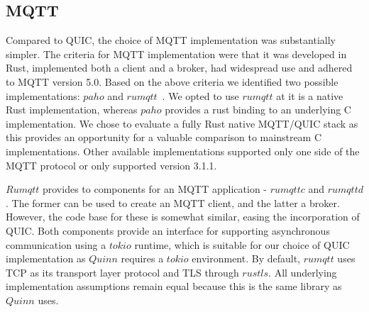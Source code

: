 \subsection{MQTT}\label{section:mqtt_impls}

Compared to QUIC, the choice of MQTT implementation was substantially simpler.
The criteria for MQTT implementation were that it was developed in Rust, implemented both a client and a broker, had widespread use and adhered to MQTT version 5.0.
Based on the above criteria we identified two possible implementations: $paho$ and $rumqtt$~\citep{bytebeam_rumqtt_2020}.
We opted to use $rumqtt$ at it is a native Rust implementation, whereas $paho$ provides a rust binding to an underlying C implementation.
We chose to evaluate a fully Rust native MQTT/QUIC stack as this provides an opportunity for a valuable comparison to mainstream C implementations.
Other available implementations supported only one side of the MQTT protocol or only supported version 3.1.1.

$Rumqtt$ provides to components for an MQTT application - $rumqttc$ and $rumqttd$.
The former can be used to create an MQTT client, and the latter a broker.
However, the code base for these is somewhat similar, easing the incorporation of QUIC.
Both components provide an interface for supporting asynchronous communication using a $tokio$ runtime, which is suitable for our choice of QUIC implementation as $Quinn$ requires a $tokio$ environment.
By default, $rumqtt$ uses TCP as its transport layer protocol and TLS through $rustls$.
All underlying implementation assumptions remain equal because this is the same library as $Quinn$ uses.
